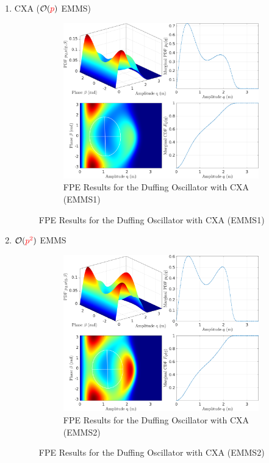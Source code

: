 \documentclass[11pt]{article}
\begin{document}
\begin{enumerate}
\begin{figure}
\begin{figure}[htbp]
\caption{FPE Results for the Duffing Oscillator with MMS2}
\end{figure}
\end{figure}
\item CXA (\(\mathcal{O}(\textcolor{red}{p})\) EMMS)
\label{sec:org1a8606c}
\begin{figure}
\begin{figure}[htbp]
\centering
\includegraphics[width=.9\linewidth]{FIGS/G3_SDOFFPE_duffing_emms1.png}
\caption{FPE Results for the Duffing Oscillator with CXA (EMMS1)}
\end{figure}
\end{figure}
\item \(\mathcal{O}(\textcolor{red}{p^2})\) EMMS
\label{sec:org625c676}
\begin{figure}
\begin{figure}[htbp]
\centering
\includegraphics[width=.9\linewidth]{FIGS/G3_SDOFFPE_duffing_emms2.png}
\caption{FPE Results for the Duffing Oscillator with CXA (EMMS2)}
\end{figure}
\end{figure}
\end{enumerate}
\end{document}
